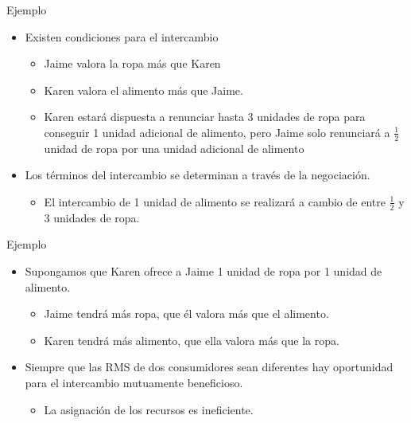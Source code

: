 \begin{frame}{Ejemplo}
	\begin{itemize}
		\item Existen condiciones para el intercambio
		\begin{itemize}
			\item Jaime valora la ropa más que Karen
			\item Karen valora el alimento más que Jaime.
			\item Karen estará dispuesta a renunciar hasta 3 unidades de ropa para conseguir 1 unidad adicional de alimento, pero Jaime solo renunciará a $\frac{1}{2}$	 unidad de ropa por una unidad adicional de alimento
		\end{itemize}
		\item Los términos del intercambio se determinan a través de la negociación.
		\begin{itemize}
			\item El intercambio de 1 unidad de alimento se realizará a cambio de entre $\frac{1}{2}$ y 3 unidades de ropa.
		\end{itemize}
	\end{itemize}
\end{frame}
\begin{frame}{Ejemplo}
	\begin{itemize}
		\item Supongamos que Karen ofrece a Jaime 1 unidad de ropa por 1 unidad de alimento.
		\begin{itemize}
			\item Jaime tendrá más ropa, que él valora más que el
			alimento.
			\item Karen tendrá más alimento, que ella valora más que 	la ropa.
		\end{itemize}
		\item Siempre que las RMS de dos consumidores sean diferentes hay oportunidad para el intercambio mutuamente beneficioso.
		\begin{itemize}
			\item La asignación de los recursos es ineficiente.
		\end{itemize}
	\end{itemize}
\end{frame}
